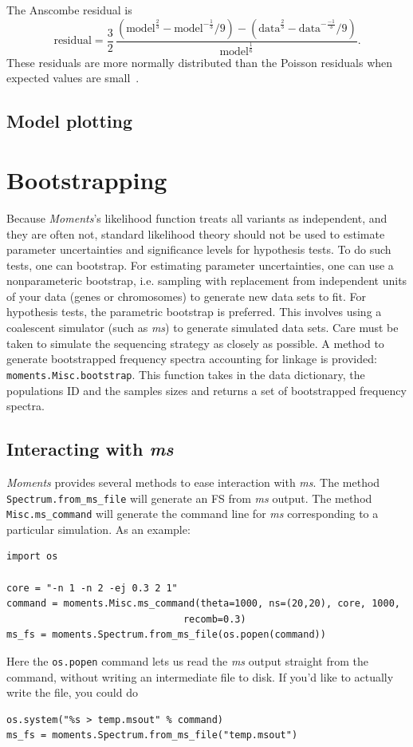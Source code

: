 \documentclass[12pt]{article}
\makeatletter
\newcommand{\ms}{\emph{ms}\xspace}
\newcommand{\py}[1]{\lstinline[language=Python, showstringspaces=False]@#1@}
\makeatother
\begin{document}
The Anscombe residual is
\begin{equation}
\text{residual} = \frac{3}{2} \, \frac{(\text{model}^\frac{2}{3} - \text{model}^{-\frac{1}{3}}/9) - (\text{data}^\frac{2}{3} - \text{data}^{-\frac{-1}{3}}/9)}{\text{model}^\frac{1}{6}}.
\end{equation}
These residuals are more normally distributed than the Poisson residuals when expected values are small~\cite{bib:Pierce1986}.

\subsection{Model plotting}


\section{Bootstrapping}

Because \textit{Moments}'s likelihood function treats all variants as independent, and they are often not, standard likelihood theory should not be used to estimate parameter uncertainties and significance levels for hypothesis tests.
To do such tests, one can bootstrap.
For estimating parameter uncertainties, one can use a nonparameteric bootstrap, i.e. sampling with replacement from independent units of your data (genes or chromosomes) to generate new data sets to fit.
For hypothesis tests, the parametric bootstrap is preferred.
This involves using a coalescent simulator (such as \ms) to generate simulated data sets.
Care must be taken to simulate the sequencing strategy as closely as possible.
A method to generate bootstrapped frequency spectra accounting for linkage is provided: \py{moments.Misc.bootstrap}. This function takes in the data dictionary, the populations ID and the samples sizes and returns a set of bootstrapped frequency spectra.

\subsection{Interacting with \ms}

\textit{Moments} provides several methods to ease interaction with \ms.
The method \py{Spectrum.from_ms_file} will generate an FS from \ms output.
The method \py{Misc.ms_command} will generate the command line for \ms corresponding to a particular simulation.
As an example:
\begin{lstlisting}
import os

core = "-n 1 -n 2 -ej 0.3 2 1"
command = moments.Misc.ms_command(theta=1000, ns=(20,20), core, 1000,
                               recomb=0.3)
ms_fs = moments.Spectrum.from_ms_file(os.popen(command))
\end{lstlisting}
Here the \py{os.popen} command lets us read the \ms output straight from the command, without writing an intermediate file to disk.
If you'd like to actually write the file, you could do
\begin{lstlisting}
os.system("%s > temp.msout" % command)
ms_fs = moments.Spectrum.from_ms_file("temp.msout")
\end{lstlisting}
\end{document}
